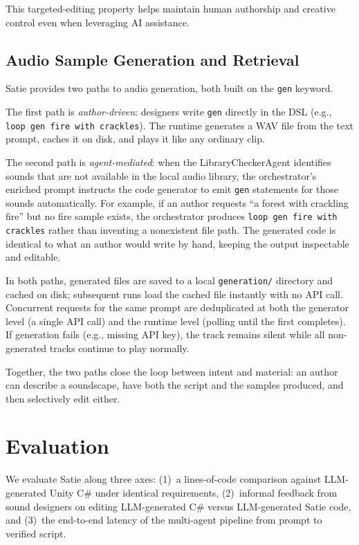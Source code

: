 \documentclass[sigconf,anonymous,review]{nimeart}
\begin{document}
This targeted-editing property helps maintain human authorship and creative control even when leveraging AI assistance.

\subsection{Audio Sample Generation and Retrieval}

Satie provides two paths to audio generation, both built on the \texttt{gen} keyword.

The first path is \textit{author-driven}: designers write \texttt{gen} directly in the DSL (e.g., \texttt{loop gen fire with crackles}). The runtime generates a WAV file from the text prompt, caches it on disk, and plays it like any ordinary clip.

The second path is \textit{agent-mediated}: when the LibraryCheckerAgent identifies sounds that are not available in the local audio library, the orchestrator's enriched prompt instructs the code generator to emit \texttt{gen} statements for those sounds automatically. For example, if an author requests ``a forest with crackling fire'' but no fire sample exists, the orchestrator produces \texttt{loop gen fire with crackles} rather than inventing a nonexistent file path. The generated code is identical to what an author would write by hand, keeping the output inspectable and editable.

In both paths, generated files are saved to a local \texttt{generation/} directory and cached on disk; subsequent runs load the cached file instantly with no API call. Concurrent requests for the same prompt are deduplicated at both the generator level (a single API call) and the runtime level (polling until the first completes). If generation fails (e.g., missing API key), the track remains silent while all non-generated tracks continue to play normally.

Together, the two paths close the loop between intent and material: an author can describe a soundscape, have both the script and the samples produced, and then selectively edit either.

\section{Evaluation}

We evaluate Satie along three axes: (1)~a lines-of-code comparison against LLM-generated Unity C\# under identical requirements, (2)~informal feedback from sound designers on editing LLM-generated C\# versus LLM-generated Satie code, and (3)~the end-to-end latency of the multi-agent pipeline from prompt to verified script.
\end{document}

